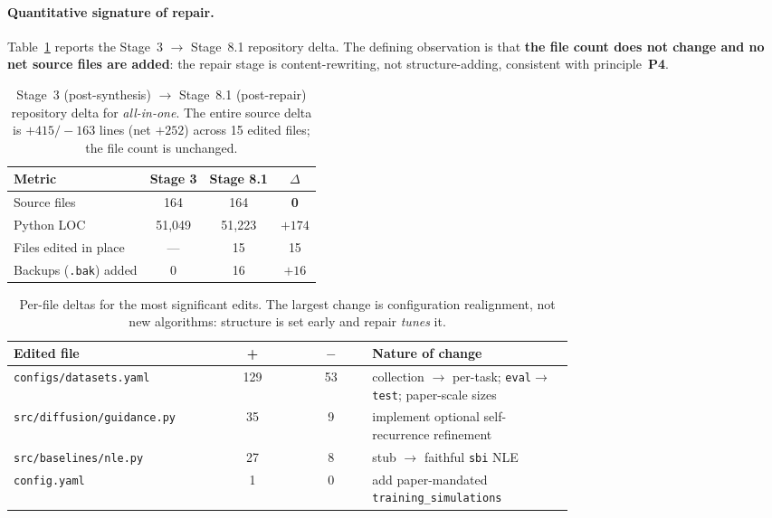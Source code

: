 \documentclass[11pt]{article}
\begin{document}
\paragraph{Quantitative signature of repair.}
Table~\ref{tab:repair-delta} reports the Stage~3 $\rightarrow$
Stage~8.1 repository delta. The defining observation is that
\textbf{the file count does not change and no net source files are
added}: the repair stage is content-rewriting, not
structure-adding, consistent with principle~\textbf{P4}.

\begin{table}[t]
\centering
\small
\begin{tabular}{lccc}
\toprule
\textbf{Metric} & \textbf{Stage 3} & \textbf{Stage 8.1} & \textbf{$\Delta$} \\
\midrule
Source files            & 164 & 164 & \textbf{0} \\
Python LOC              & 51{,}049 & 51{,}223 & $+174$ \\
Files edited in place   & --- & 15 & 15 \\
Backups (\texttt{.bak}) added & 0 & 16 & $+16$ \\
\bottomrule
\end{tabular}
\caption{Stage~3 (post-synthesis) $\rightarrow$ Stage~8.1
(post-repair) repository delta for \emph{all-in-one}. The entire
source delta is $+415 / -163$ lines (net $+252$) across 15 edited
files; the file count is unchanged.}
\label{tab:repair-delta}
\end{table}

\begin{table}[t]
\centering
\small
\setlength\tabcolsep{4pt}
\begin{tabular}{@{}>{\raggedright\arraybackslash}p{0.36\linewidth}cc>{\raggedright\arraybackslash}p{0.36\linewidth}@{}}
\toprule
\textbf{Edited file} & \textbf{+} & \textbf{$-$} & \textbf{Nature of change} \\
\midrule
\texttt{configs/\allowbreak datasets.yaml} & 129 & 53 & collection $\rightarrow$ per-task; \texttt{eval}$\rightarrow$\texttt{test}; paper-scale sizes \\
\texttt{src/diffusion/\allowbreak guidance.py} & 35 & 9 & implement optional self-recurrence refinement \\
\texttt{src/baselines/\allowbreak nle.py} & 27 & 8 & stub $\rightarrow$ faithful \texttt{sbi} NLE \\
\texttt{config.yaml} & 1 & 0 & add paper-mandated \texttt{training\_\allowbreak simulations} \\
\bottomrule
\end{tabular}
\caption{Per-file deltas for the most significant edits. The
largest change is configuration realignment, not new algorithms:
structure is set early and repair \emph{tunes} it.}
\label{tab:repair-perfile}
\end{table}
\end{document}
